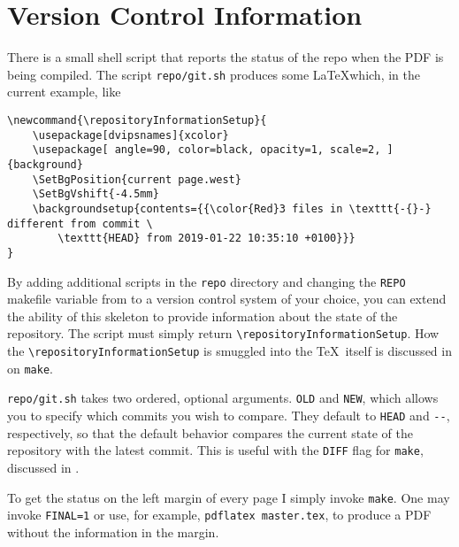 \section{Version Control Information}\label{sec:vc}

There is a small shell script that reports the status of the repo when the PDF is being compiled.
The script \texttt{repo/git.sh} produces some \LaTeX which, in the current example, like
\begin{verbatim}
\newcommand{\repositoryInformationSetup}{
    \usepackage[dvipsnames]{xcolor}
    \usepackage[ angle=90, color=black, opacity=1, scale=2, ]{background}
    \SetBgPosition{current page.west}
    \SetBgVshift{-4.5mm}
    \backgroundsetup{contents={{\color{Red}3 files in \texttt{-{}-} different from commit \
        \texttt{HEAD} from 2019-01-22 10:35:10 +0100}}}
}
\end{verbatim}

By adding additional scripts in the \texttt{repo} directory and changing the \texttt{REPO} makefile variable from \git to a version control system of your choice, you can extend the ability of this skeleton to provide information about the state of the repository.
The script must simply return \texttt{{\textbackslash}repositoryInformationSetup}.
How the \texttt{{\textbackslash}repositoryInformationSetup} is smuggled into the \TeX\ itself is discussed in  on \texttt{make}.

\texttt{repo/git.sh} takes two ordered, optional arguments.  \texttt{OLD} and \texttt{NEW}, which allows you to specify which commits you wish to compare.  They default to \texttt{HEAD} and \texttt{-{}-}, respectively, so that the default behavior compares the current state of the repository with the latest commit.  This is useful with the \texttt{DIFF} flag for \texttt{make}, discussed in .

To get the \git status on the left margin of every page I simply invoke \texttt{make}.
One may invoke \texttt{\make FINAL=1} or use, for example, \texttt{pdflatex master.tex}, to produce a PDF without the \git information in the margin.
